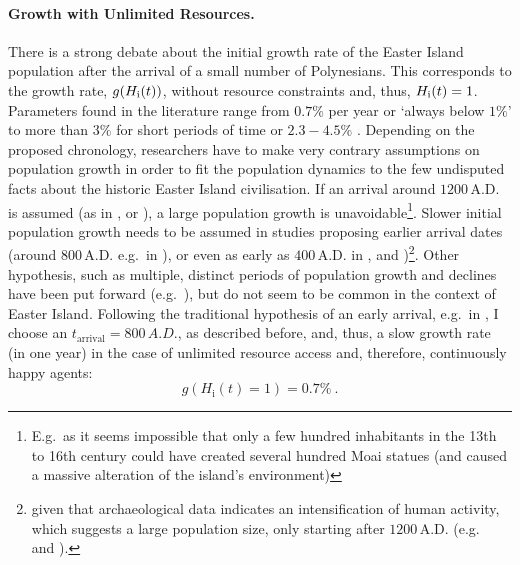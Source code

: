 \paragraph{Growth with Unlimited Resources.}
There is a strong debate about the initial growth rate of the Easter Island population after the arrival of a small number of Polynesians.
This corresponds to the growth rate, $g(H_{\rm i}(t))$, without resource constraints and, thus, $H_{\rm i}(t)=1$.
Parameters found in the literature range from $0.7\%$ per year \citep{Bahn2017} or `always below $1\%$' \citep{Brander1998} to more than $3\%$ \citep{Hunt2007} for short periods of time or $2.3-4.5\%$ \citep{Brandt2015}.
Depending on the proposed chronology, researchers have to make very contrary assumptions on population growth in order to fit the population dynamics to the few undisputed facts about the historic Easter Island civilisation. 
If an arrival around $1200\, \text{A.D.}$ is assumed (as in , or ), a large population growth is unavoidable\footnote{E.g.\ as it seems impossible that only a few hundred inhabitants in the 13th to 16th century could have created several hundred Moai statues (and caused a massive alteration of the island's environment)}.
Slower initial population growth needs to be assumed in studies proposing earlier arrival dates (around $800\, \text{A.D.}$ e.g.\ in ), or even as early as $400\, \text{A.D.}$ in , and )\footnote{given that archaeological data indicates an intensification of human activity, which suggests a large population size, only starting after $1200\, \text{A.D.}$ (e.g.\  and ).}.
Other hypothesis, such as multiple, distinct periods of population growth and declines have been put forward (e.g.\ ), but do not seem to be common in the context of Easter Island.
Following the traditional hypothesis of an early arrival, e.g.\ in \citet{Bahn2017}, I choose an $t_\text{arrival}=800\, A.D.$, as described before, and, thus, a slow growth rate (in one year) in the case of unlimited resource access and, therefore, continuously happy agents: 
\begin{equation}
	g(H_\text{i}(t)=1) = 0.7\% \ .
\end{equation}

